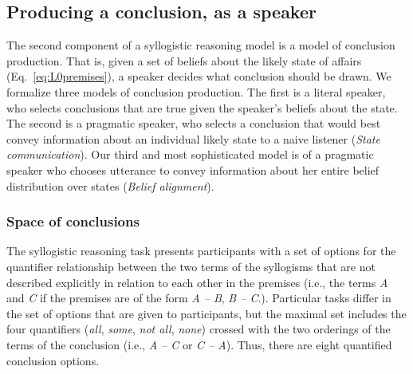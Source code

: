 \documentclass[floatsintext, doc]{apa6}
\newcommand{\mht}[1]{{\textcolor{Blue}{[mht: #1]}}}
\begin{document}
\subsection{Producing a conclusion, as a speaker}

The second component of a syllogistic reasoning model is a model of conclusion production. 
That is, given a set of beliefs about the likely state of affairs (Eq.~\ref{eq:L0premises}), a speaker decides what conclusion should be drawn.
We formalize three models of conclusion production.
The first is a literal speaker, who selects conclusions that are true given the speaker's beliefs about the state. 
The second is a pragmatic speaker, who selects a conclusion that would best convey information about an individual likely state to a naive listener (\emph{State communication}). 
Our third and most sophisticated model is of a pragmatic speaker who chooses utterance to convey information about her entire belief distribution over states (\emph{Belief alignment}). 

\subsubsection{Space of conclusions}

The syllogistic reasoning task presents participants with a set of options for the quantifier relationship between the two terms of the syllogisms that are not described explicitly in relation to each other in the premises (i.e., the terms \emph{A} and \emph{C} if the premises are of the form \emph{A -- B}, \emph{B -- C}.). 
Particular tasks differ in the set of options that are given to participants, but the maximal set includes the four quantifiers  (\emph{all}, \emph{some}, \emph{not all}, \emph{none}) crossed with the two orderings of the terms of the conclusion (i.e., \emph{A -- C} or \emph{C -- A}).
Thus, there are eight quantified conclusion options. 
\end{document}
